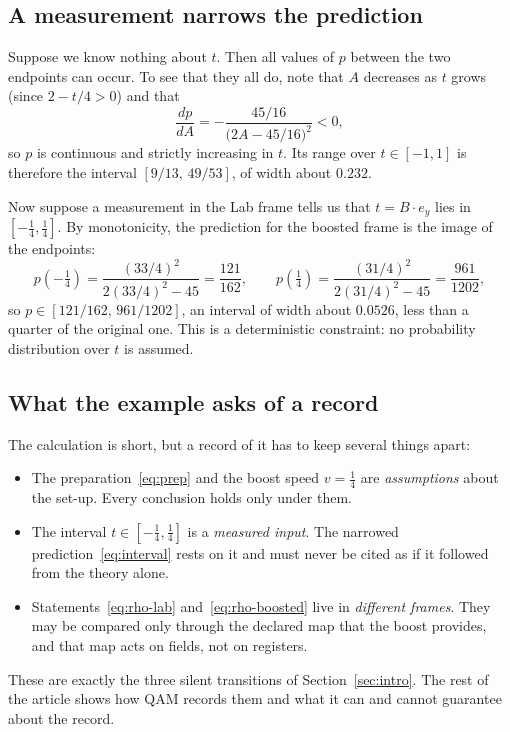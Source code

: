 \subsection{A measurement narrows the prediction}

Suppose we know nothing about $t$. Then all values of $p$ between the two endpoints can occur. To see that they all do, note that
$A$ decreases as $t$ grows (since $2-t/4>0$) and that
\[
\frac{dp}{dA} = -\frac{45/16}{\bigl(2A-45/16\bigr)^2} < 0,
\]
so $p$ is continuous and strictly increasing in $t$. Its range over $t\in[-1,1]$ is therefore the interval $[9/13,\,49/53]$, of width
about $0.232$.

Now suppose a measurement in the Lab frame tells us that $t=B\cdot e_y$ lies in $[-\tfrac14,\tfrac14]$. By monotonicity, the
prediction for the boosted frame is the image of the endpoints:
\begin{equation}\label{eq:interval}
p(-\tfrac14)=\frac{(33/4)^2}{2(33/4)^2-45}=\frac{121}{162},\qquad
p(\tfrac14)=\frac{(31/4)^2}{2(31/4)^2-45}=\frac{961}{1202},
\end{equation}
so $p\in[121/162,\,961/1202]$, an interval of width about $0.0526$, less than a quarter of the original one. This is a deterministic
constraint: no probability distribution over $t$ is assumed.

\subsection{What the example asks of a record}

The calculation is short, but a record of it has to keep several things apart:
\begin{itemize}[leftmargin=1.5em]
\item The preparation~\eqref{eq:prep} and the boost speed $v=\frac14$ are \emph{assumptions} about the set-up. Every conclusion
holds only under them.
\item The interval $t\in[-\frac14,\frac14]$ is a \emph{measured input}. The narrowed prediction~\eqref{eq:interval} rests on it and
must never be cited as if it followed from the theory alone.
\item Statements~\eqref{eq:rho-lab} and~\eqref{eq:rho-boosted} live in \emph{different frames}. They may be compared only through
the declared map that the boost provides, and that map acts on fields, not on registers.
\end{itemize}
These are exactly the three silent transitions of Section~\ref{sec:intro}. The rest of the article shows how QAM records them and
what it can and cannot guarantee about the record.
